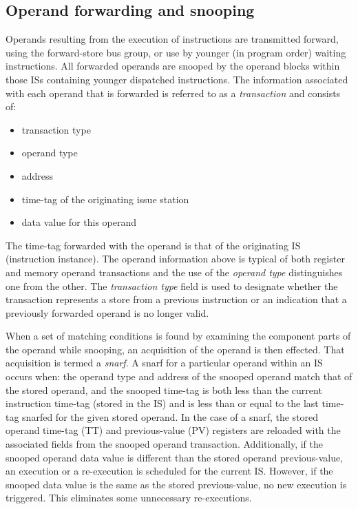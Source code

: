 \documentclass[10pt,dvips]{article}
\begin{document}
\subsection{Operand forwarding and snooping}
%
Operands resulting from the execution of instructions
are transmitted forward, using the forward-store bus group,
or use by younger (in program order) waiting instructions.
All forwarded operands are snooped by the operand blocks
within those ISs containing younger dispatched instructions.
The information associated with each operand that is
forwarded is referred
to as a {\em transaction} and consists of:
%
\begin{itemize}
\vspace{-0.10in}
\item{transaction type}
\vspace{-0.10in}
\item{operand type}
\vspace{-0.10in}
\item{address}
\vspace{-0.10in}
\item{time-tag of the originating issue station}
\vspace{-0.10in}
\item{data value for this operand}
\vspace{-0.10in}
\end{itemize}   
%
The time-tag forwarded with the operand is that of the originating
IS (instruction instance).
The operand information above is typical of both
register and memory operand transactions and the use
of the \textit{operand type} distinguishes one from the other.
The \textit{transaction type} field is used to 
designate whether the transaction represents a store from
a previous instruction or an indication that
a previously forwarded operand is no longer valid.

When a set of matching conditions is found by examining the
component parts of the operand while snooping, an acquisition
of the operand is then effected.  
That acquisition is termed a \textit{snarf}.
A snarf for a particular operand
within an IS occurs when: the operand type and address
of the snooped operand match that of the stored operand, and
the snooped time-tag is both less than the current instruction
time-tag (stored in the IS) and is less than or
equal to the last time-tag snarfed for the given stored operand.
In the case of a snarf, the stored operand time-tag (TT) and
previous-value (PV) registers are reloaded with the associated
fields from the snooped operand transaction.
Additionally, if the snooped operand data value is different
than the stored operand previous-value, an execution or a re-execution
is scheduled for the current IS.
However, if the snooped data value is the same as the stored
previous-value, no new execution is triggered.
This eliminates some unnecessary re-executions.
\end{document}
